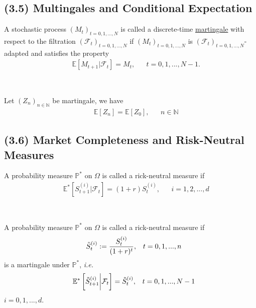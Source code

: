 \documentclass[12pt]{extarticle}
\newcommand{\<}{\langle}
\renewcommand{\>}{\rangle}
\theoremstyle{definition}
\begin{document}
\subsection{(3.5) Multingales and Conditional Expectation}
\begin{tcolorbox}[enhanced, drop fuzzy shadow, title=Definition 3.4]
A stochastic process $(M_t)_{t=0,1,...,N}$ is called a discrete-time \underline{martingale} with respect to the filtration $(\mathcal{F}_t)_{t=0,1,...,N}$ if $(M_t)_{t=0,1,...,N}$ is $(\mathcal{F}_t)_{t=0,1,...,N}$-adapted and satisfies the property
\begin{align*}
    && \mathbb{E}[M_{t+1} | \mathcal{F}_t] = M_t, && t=0,1,...,N-1.
\end{align*}
\end{tcolorbox}
\ \\
\begin{tcolorbox}[enhanced, drop fuzzy shadow, title=Proposition 3.5]
Let $(Z_n)_{n \in \mathbb{N}}$ be martingale, we have
\begin{align*}
    && \mathbb{E}[Z_{n}] = \mathbb{E}[Z_{0}], && n \in \mathbb{N}
\end{align*}
\end{tcolorbox}

\subsection{(3.6) Market Completeness and Risk-Neutral Measures}
\begin{tcolorbox}[enhanced, drop fuzzy shadow, title=Definition 3.8]
A probability measure $\mathbb{P}^*$ on $\Omega$ is called a rick-neutral measure if
\begin{align*}
    && \mathbb{E}^*\left[S_{t+1}^{(i)}\bigg| \mathcal{F}_t \right]=(1+r)S_{t}^{(i)}, && i=1,2,...,d
\end{align*}
\end{tcolorbox}
\ \\
\begin{tcolorbox}[enhanced, drop fuzzy shadow, title=Definition 3.9]
A probability measure $\mathbb{P}^*$ on $\Omega$ is called a rick-neutral measure if
\begin{align*}
    && \Tilde{S}_{t}^{(i)}:= \frac{S_t^{(i)}}{(1+r)^t}, && t=0,1,...,n
\end{align*}
is a martingale under $\mathbb{P}^*$, \textit{i.e.}
\begin{align*}
    && \mathbb{E}^*\left[\Tilde{S}_{t+1}^{(i)}\bigg| \mathcal{F}_t \right]=\Tilde{S}_{t}^{(i)}, && t=0,1,...,N-1
\end{align*}
$i=0,1,...,d$.
\end{tcolorbox}
\end{document}
